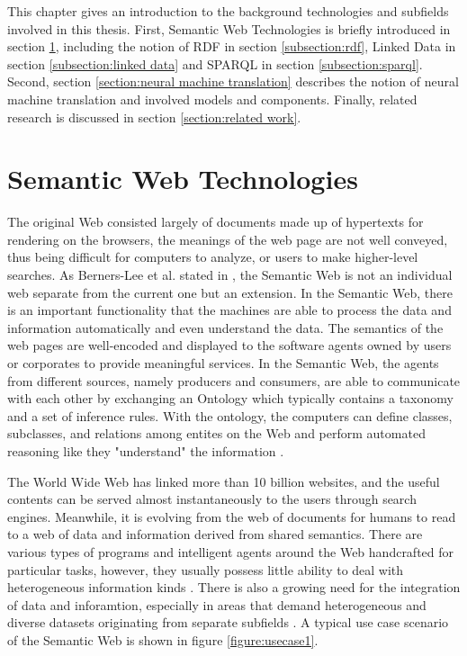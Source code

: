 
This chapter gives an introduction to the background technologies and subfields involved in this thesis. First, Semantic Web Technologies is briefly introduced in section \ref{section:semantic web technologies}, including the notion of RDF in section \ref{subsection:rdf}, Linked Data in section \ref{subsection:linked data} and SPARQL in section \ref{subsection:sparql}. Second, section \ref{section:neural machine translation} describes the notion of neural machine translation and involved models and components. Finally, related research is discussed in section \ref{section:related work}.

\section{Semantic Web Technologies} \label{section:semantic web technologies}

The original Web consisted largely of documents made up of hypertexts for rendering on the browsers, the meanings of the web page are not well conveyed, thus being difficult for computers to analyze, or users to make higher-level searches. As Berners-Lee et al. stated in \cite{Berners-Lee2001}, the Semantic Web is not an individual web separate from the current one but an extension. In the Semantic Web, there is an important functionality that the machines are able to process the data and information automatically and even understand the data. The semantics of the web pages are well-encoded and displayed to the software agents owned by users or corporates to provide meaningful services. In the Semantic Web, the agents from different sources, namely producers and consumers, are able to communicate with each other by exchanging an Ontology which typically contains a taxonomy and a set of inference rules. With the ontology, the computers can define classes, subclasses, and relations among entites on the Web and perform automated reasoning like they "understand" the information \cite{Berners-Lee2001}.

The World Wide Web has linked more than 10 billion websites, and the useful contents can be served almost instantaneously to the users through search engines. Meanwhile, it is evolving from the web of documents for humans to read to a web of data and information derived from shared semantics. There are various types of programs and intelligent agents around the Web handcrafted for particular tasks, however, they usually possess little ability to deal with heterogeneous information kinds \cite{Shadbolt2006}. There is also a growing need for the integration of data and inforamtion, especially in areas that demand heterogeneous and diverse datasets originating from separate subfields \cite{Shadbolt2006}. A typical use case scenario of the Semantic Web is shown in figure \ref{figure:usecase1}.

